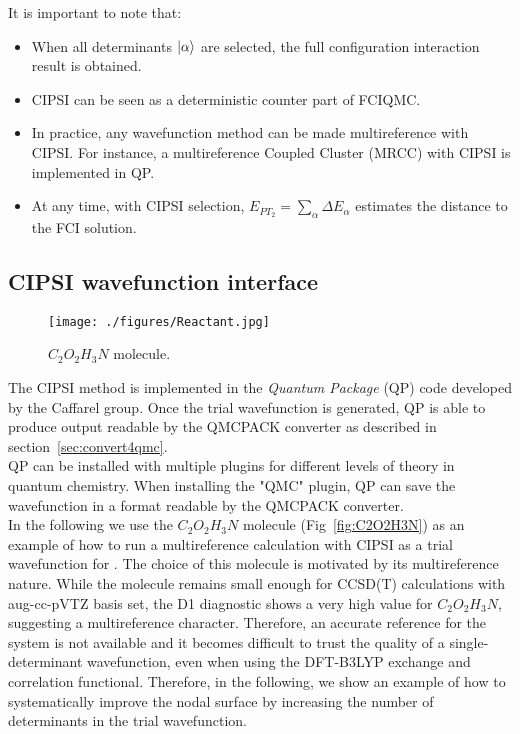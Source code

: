 It is important to note that:
\begin{itemize}
\item When all determinants $\lvert \alpha \rangle$ are selected, the full configuration interaction result is obtained.\\
\item CIPSI can be seen as a deterministic counter part of FCIQMC. \\
\item In practice, any wavefunction method can be made multireference with CIPSI. For instance, a multireference Coupled Cluster (MRCC) with CIPSI is implemented in QP.\cite{Garniron2017-1}\\
\item At any time, with CIPSI selection, $E_{PT_2}=\sum_\alpha \Delta E_\alpha$ estimates the distance to the FCI solution.
\end{itemize}


\subsection{CIPSI wavefunction interface}
\label{sec:cipsi}


\begin{figure}
\begin{center}
\texttt{[image: ./figures/Reactant.jpg]}
\end{center}
\caption{$C_2O_2H_3N$ molecule.}
\protect{\label{fig:C2O2H3N}}
\end{figure}
The CIPSI method
is implemented in the \textit{Quantum Package} (QP) code\cite{QP} developed by the Caffarel group. Once the trial wavefunction is generated, QP is able to produce output readable by the QMCPACK converter as described in section~\ref{sec:convert4qmc}.\\
QP can be installed with multiple plugins for different levels of theory in quantum chemistry. When installing the "QMC" plugin, QP can save the wavefunction in a format readable by the QMCPACK converter. \\

In the following we use the $C_2O_2H_3N$ molecule (Fig~\ref{fig:C2O2H3N}) as an example of how to run a multireference calculation with CIPSI as a trial wavefunction for \qmcpack. The choice of this molecule is motivated by its multireference nature. While the molecule remains small enough for CCSD(T) calculations with aug-cc-pVTZ basis set, the D1 diagnostic shows a very high value for  $C_2O_2H_3N$, suggesting a multireference character.  Therefore, an accurate reference for the system is not available and it becomes difficult to trust the quality of a single-determinant wavefunction, even when using the DFT-B3LYP exchange and correlation functional. Therefore, in the following, we show an example of how to systematically improve the nodal surface by increasing the number of determinants in the trial wavefunction.\\

